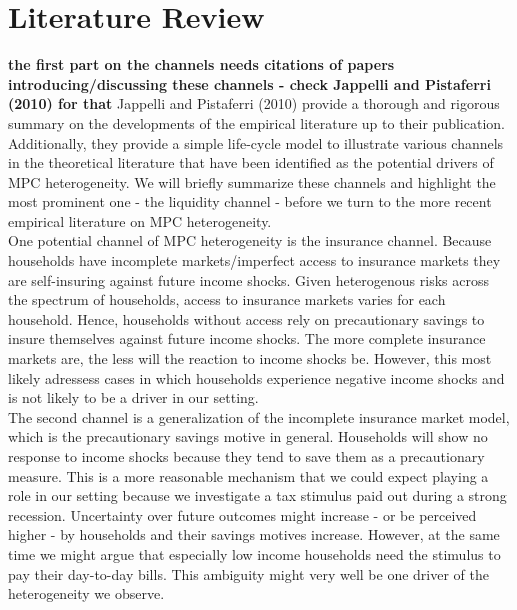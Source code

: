 \section{Literature Review} \label{sec:lit}
\textbf{the first part on the channels needs citations of papers introducing/discussing these channels - check Jappelli and Pistaferri (2010) for that}
Jappelli and Pistaferri (2010) provide a thorough and rigorous summary on the developments of the empirical literature up to their publication. Additionally, they provide a simple life-cycle model to illustrate various channels in the theoretical literature that have been identified as the potential drivers of MPC heterogeneity. We will briefly summarize these channels and highlight the most prominent one - the liquidity channel - before we turn to the more recent empirical literature on MPC heterogeneity. \\
One potential channel of MPC heterogeneity is the insurance channel. Because households have incomplete markets/imperfect access to insurance markets they are self-insuring against future income shocks. Given heterogenous risks across the spectrum of households, access to insurance markets varies for each household. Hence, households without access rely on precautionary savings to insure themselves against future income shocks. The more complete insurance markets are, the less will the reaction to income shocks be. However, this most likely adressess cases in which households experience negative income shocks and is not likely to be a driver in our setting. \\
The second channel is a generalization of the incomplete insurance market model, which is the precautionary savings motive in general. Households will show no response to income shocks because they tend to save them as a precautionary measure. This is a more reasonable mechanism that we could expect playing a role in our setting because we investigate a tax stimulus paid out during a strong recession. Uncertainty over future outcomes might increase - or be perceived higher - by households and their savings motives increase. However, at the same time we might argue that especially low income households need the stimulus to pay their day-to-day bills. This ambiguity might very well be one driver of the heterogeneity we observe. \\
